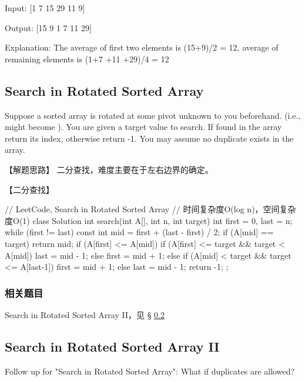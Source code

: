 Input:
[1 7 15 29 11 9]

Output:
[15 9 1 7 11 29]

Explanation:
The average of first two elements is (15+9)/2 = 12, average of remaining elements is (1+7 +11 +29)/4 = 12

\subsection{Search in Rotated Sorted Array}
\label{sec:search-in-rotated-sorted-array}


Suppose a sorted array is rotated at some pivot unknown to you beforehand.
(i.e.,  might become ).
You are given a target value to search. If found in the array return its index,
otherwise return -1.
You may assume no duplicate exists in the array.

【解题思路】
二分查找，难度主要在于左右边界的确定。


【二分查找】
\begin{Code}
	// LeetCode, Search in Rotated Sorted Array
	// 时间复杂度O(log n)，空间复杂度O(1)
	class Solution {
		int search(int A[], int n, int target) {
			int first = 0, last = n;
			while (first != last) {
				const int mid = first  + (last - first) / 2;
				if (A[mid] == target) return mid;
				if (A[first] <= A[mid]) {
					if (A[first] <= target && target < A[mid])
						last = mid - 1;
					else	
                        first = mid + 1;
				} else {
					if (A[mid] < target && target <= A[last-1])
						first = mid + 1;
					else	
                        last = mid - 1;
				}
			}
			return -1;
		}
	};
\end{Code}


\subsubsection{相关题目}

\begindot
\item Search in Rotated Sorted Array II，见 \S
\ref{sec:search-in-rotated-sorted-array-ii}
\myenddot


\subsection{Search in Rotated Sorted Array II}
\label{sec:search-in-rotated-sorted-array-ii}



Follow up for "Search in Rotated Sorted Array": What if duplicates are
allowed?


